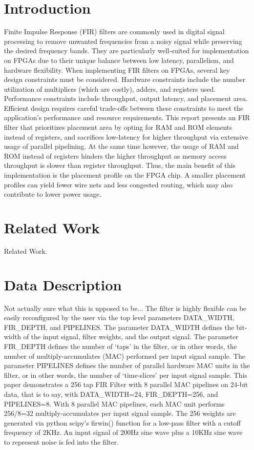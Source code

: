 \documentclass{article}
\begin{document}
\section{Introduction}
    Finite Impulse Response (FIR) filters are commonly used in digital signal processing to remove unwanted frequencies from a noisy signal while preserving the desired frequency bands.
    They are particularly well-suited for implementation on FPGAs due to their unique balance between low latency, parallelism, and hardware flexibility.
    When implementing FIR filters on FPGAs, several key design constraints must be considered.
    Hardware constraints include the number utilization of multipliers (which are costly), adders, and registers used.
    Performance constraints include throughput, output latency, and placement area.
    Efficient design requires careful trade-offs between these constraints to meet the application's performance and resource requirements.
    This report presents an FIR filter that prioritizes placement area by opting for RAM and ROM elements instead of registers, and sacrifices low-latency for higher throughput via extensive usage of parallel pipelining.
    At the same time however, the usage of RAM and ROM instead of registers hinders the higher throughput as memory access throughput is slower than register throughput.
    Thus, the main benefit of this implementation is the placement profile on the FPGA chip.
    A smaller placement profiles can yield fewer wire nets and less congested routing, which may also contribute to lower power usage.

\section{Related Work}
    Related Work.

\section{Data Description}
    Not actually sure what this is upposed to be...
    The filter is highly flexible can be easily reconfigured by the user via the top level parameters DATA\_WIDTH, FIR\_DEPTH, and PIPELINES.
    The parameter DATA\_WIDTH defines the bit-width of the input signal, filter weights, and the output signal.
    The parameter FIR\_DEPTH defines the number of `taps' in the filter, or in other words, the number of multiply-accumulates (MAC) performed per input signal sample.
    The parameter PIPELINES defines the number of parallel hardware MAC units in the filter, or in other words, the number of `time-slices' per input signal sample.
    This paper demonstrates a 256 tap FIR Filter with 8 parallel MAC pipelines on 24-bit data, that is to say, with DATA\_WIDTH=24, FIR\_DEPTH=256, and PIPELINES=8.
    With 8 parallel MAC pipelines, each MAC unit performs 256/8=32 multiply-accumulates per input signal sample.
    The 256 weights are generated via python scipy's firwin() function for a low-pass filter with a cutoff frequency of 2KHz.
    An input signal of 200Hz sine wave plus a 10KHz sine wave to represent noise is fed into the filter.
\end{document}

